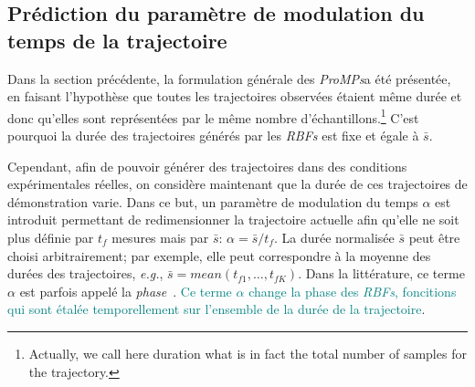 \documentclass[utf8]{frontiersSCNS} %
\newcommand{\toimprove}[1]{\textcolor{teal}{#1}}
\newcommand{\todo}[1]{\textcolor{red}{\textbf{/*#1*/}}}
\begin{document}

\subsection{Prédiction du paramètre de modulation du temps de la trajectoire}\label{sec:predictDuration}
Dans la section précédente, la formulation générale des \textit{ProMPs}a été présentée, en faisant l'hypothèse que toutes les trajectoires observées étaient même durée et donc qu'elles sont représentées par le même nombre d'échantillons.\footnote{Actually, we call here duration what is in fact the total number of samples for the trajectory.}
C'est pourquoi la durée des trajectoires générés par les \textit{RBFs} est fixe et égale à $\bar{s}$. 

Cependant, afin de pouvoir générer des trajectoires dans des conditions expérimentales réelles, on considère maintenant que la durée de ces trajectoires de démonstration varie.
Dans ce but, un paramètre de modulation du temps $\alpha$ est introduit permettant de redimensionner la trajectoire actuelle afin qu'elle ne soit plus définie par $t_{f}$ mesures mais par $\bar{s}$: $\alpha = \bar{s} / t_{f}$.
La durée normalisée $\bar{s}$ peut être choisi arbitrairement; par exemple, elle peut correspondre à la moyenne des durées des trajectoires, \textit{e.g.}, $\bar{s}=mean(t_{f1},\ldots,t_{fK})$.
Dans la littérature, ce terme $\alpha$ est parfois appelé la \textit{phase}~\cite{paraschos2013probabilistic,paraschos2013probabilisticTrajectory}. 
\toimprove{Ce terme $\alpha$ change la phase des \textit{RBFs}, foncitions qui sont étalée temporellement sur l'ensemble de la durée de la trajectoire}.
\end{document}
